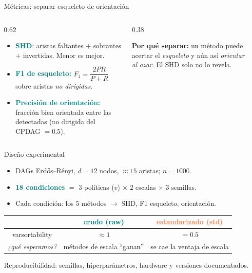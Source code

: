 \documentclass[10pt,aspectratio=169]{beamer}
\newcommand{\hl}[1]{\textcolor{teal}{\textbf{#1}}}
\begin{document}
\begin{frame}{Métricas: separar esqueleto de orientación}
  \begin{columns}[T]
  \begin{column}{0.62\textwidth}
  \begin{itemize}
    \item \hl{SHD}: aristas faltantes $+$ sobrantes $+$ invertidas.
          \textcolor{ink!55}{Menor es mejor.}
    \item \hl{F1 de esqueleto:} $F_1=\dfrac{2PR}{P+R}$ sobre aristas
          \emph{no dirigidas}.
    \item \hl{Precisión de orientación:} fracción bien orientada entre las
          detectadas (no dirigida del CPDAG $=0.5$).
  \end{itemize}
  \end{column}
  \begin{column}{0.38\textwidth}
  \begin{warn}
  \footnotesize \textbf{Por qué separar:} un método puede acertar el \emph{esqueleto}
  y aún así \emph{orientar al azar}. El SHD solo no lo revela.
  \end{warn}
  \end{column}
  \end{columns}
\end{frame}

\begin{frame}{Diseño experimental}
  \begin{itemize}
    \item DAGs Erdős–Rényi, $d=12$ nodos, $\approx 15$ aristas; $n=1000$.
    \item \hl{18 condiciones} $=$ 3 políticas ($v$) $\times$ 2 escalas $\times$ 3 semillas.
    \item Cada condición: los 5 métodos $\to$ SHD, F1 esqueleto, orientación.
  \end{itemize}
  \vfill
  \centering
  \begin{tcolorbox}[enhanced, width=0.9\textwidth, colback=mist, colframe=ink,
    boxrule=0.6pt, arc=4pt, left=8pt, right=8pt, top=6pt, bottom=6pt]
  \small
  \begin{tabular}{@{}c c c@{}}
   & \textcolor{teal}{\textbf{crudo (raw)}} & \textcolor{coral}{\textbf{estandarizado (std)}} \\
  \midrule
  varsortability & $\approx 1$ & $=0.5$ \\
  \emph{¿qué esperamos?} & métodos de escala ``ganan'' & se cae la ventaja de escala \\
  \end{tabular}
  \end{tcolorbox}

  \vspace{4pt}
  {\footnotesize\textcolor{ink!55}{Reproducibilidad: semillas, hiperparámetros, hardware y versiones documentados.}}
\end{frame}
\end{document}
